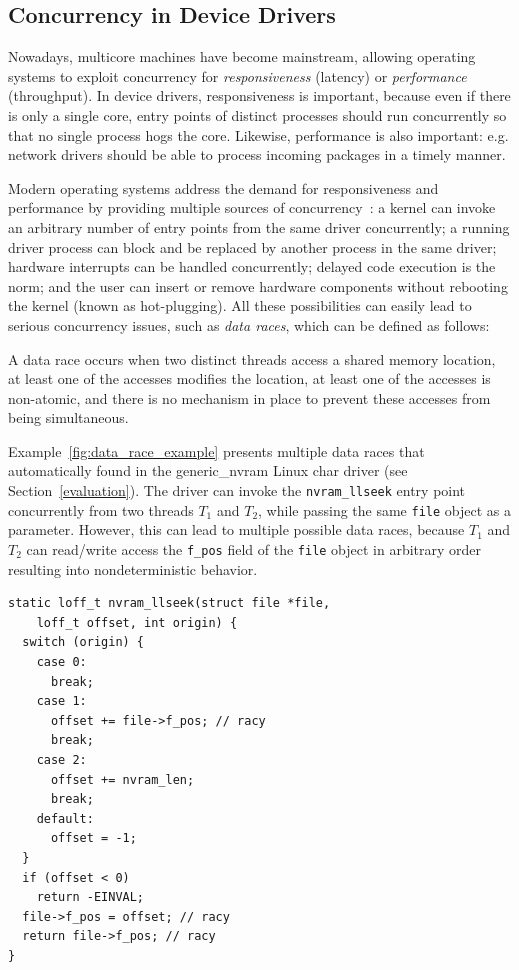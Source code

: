 \subsection{Concurrency in Device Drivers}
\label{bg:concurrency}

Nowadays, multicore machines have become mainstream, allowing operating systems to exploit concurrency for \emph{responsiveness} (latency) or \emph{performance} (throughput). In device drivers, responsiveness is important, because even if there is only a single core, entry points of distinct processes should run concurrently so that no single process hogs the core. Likewise, performance is also important: e.g. network drivers should be able to process incoming packages in a timely manner.

Modern operating systems address the demand for responsiveness and performance by providing multiple sources of concurrency~\cite{corbet2005linux}: a kernel can invoke an arbitrary number of entry points from the same driver concurrently; a running driver process can block and be replaced by another process in the same driver; hardware interrupts can be handled concurrently; delayed code execution is the norm; and the user can insert or remove hardware components without rebooting the kernel (known as hot-plugging). All these possibilities can easily lead to serious concurrency issues, such as \emph{data races}, which can be defined as follows:

\begin{definition}
\label{definition:datarace}
A data race occurs when two distinct threads access a shared memory location, at least one of the accesses modifies the location, at least one of the accesses is non-atomic, and there is no mechanism in place to prevent these accesses from being simultaneous.
\end{definition}

Example~\ref{fig:data_race_example} presents multiple data races that \whoop automatically found in the generic\_nvram Linux char driver (see Section~\ref{evaluation}). The driver can invoke the \texttt{nvram\_llseek} entry point concurrently from two threads $T_1$ and $T_2$, while passing the same \texttt{file} object as a parameter. However, this can lead to multiple possible data races, because $T_1$ and $T_2$ can read/write access the \texttt{f\_pos} field of the \texttt{file} object in arbitrary order resulting into nondeterministic behavior.

\begin{lstlisting}[caption = Data races in a Linux driver that we discovered using \whoop., label = fig:data_race_example]
static loff_t nvram_llseek(struct file *file,
    loff_t offset, int origin) {
  switch (origin) {
    case 0:
      break;
    case 1:
      offset += file->f_pos; // racy
      break;
    case 2:
      offset += nvram_len;
      break;
    default:
      offset = -1;
  }
  if (offset < 0)
    return -EINVAL;
  file->f_pos = offset; // racy
  return file->f_pos; // racy
}
\end{lstlisting}

